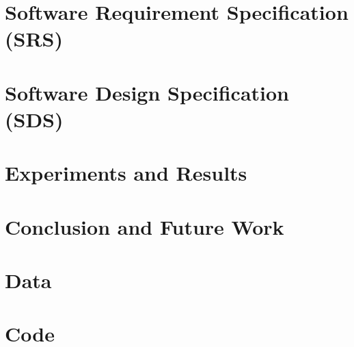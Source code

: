 \documentclass[12pt]{report}
\begin{document}
\chapter{Software Requirement Specification (SRS)}
\label{chap:srs}


\chapter{Software Design Specification (SDS)}
\label{chap:sds}


\chapter{Experiments and Results}
\label{chap:results}


\chapter{Conclusion and Future Work}
\label{chap:outro}


\begin{appendices}


\chapter{Data}


\chapter{Code}

\end{appendices}

\printbibliography[heading=bibintoc,title={References}]
\end{document}
